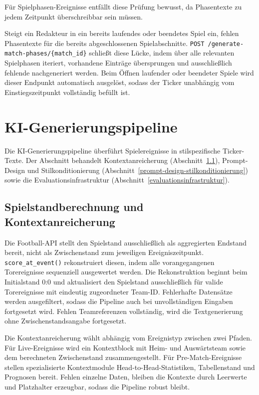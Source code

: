 Für Spielphasen-Ereignisse entfällt diese Prüfung bewusst, da Phasentexte zu jedem Zeitpunkt überschreibbar sein müssen.

Steigt ein Redakteur in ein bereits laufendes oder beendetes Spiel ein, fehlen Phasentexte für die bereits abgeschlossenen Spielabschnitte. \texttt{POST /generate-match-phases/\{match\_id\}} schließt diese Lücke, indem über alle relevanten Spielphasen iteriert, vorhandene Einträge übersprungen und ausschließlich fehlende nachgeneriert werden. Beim Öffnen laufender oder beendeter Spiele wird dieser Endpunkt automatisch ausgelöst, sodass der Ticker unabhängig vom Einstiegszeitpunkt vollständig befüllt ist.


\section{KI-Generierungspipeline}\label{ki-generierungspipeline}

Die KI-Generierungspipeline überführt Spielereignisse in stilspezifische Ticker-Texte. Der Abschnitt behandelt Kontextanreicherung (Abschnitt~\ref{kontextanreicherung-pipeline}), Prompt-Design und Stilkonditionierung (Abschnitt~\ref{prompt-design-stilkonditionierung}) sowie die Evaluationsinfrastruktur (Abschnitt~\ref{evaluationsinfrastruktur}).

\subsection{Spielstandberechnung und Kontextanreicherung}\label{kontextanreicherung-pipeline}

Die Football-API stellt den Spielstand ausschließlich als aggregierten Endstand bereit, nicht als Zwischenstand zum jeweiligen Ereigniszeitpunkt. \texttt{score\_at\_event()} rekonstruiert diesen, indem alle vorangegangenen Torereignisse sequenziell ausgewertet werden. Die Rekonstruktion beginnt beim Initialstand 0:0 und aktualisiert den Spielstand ausschließlich für valide Torereignisse mit eindeutig zugeordneter Team-ID. Fehlerhafte Datensätze werden ausgefiltert, sodass die Pipeline auch bei unvollständigen Eingaben fortgesetzt wird. Fehlen Teamreferenzen vollständig, wird die Textgenerierung ohne Zwischenstandsangabe fortgesetzt.

Die Kontextanreicherung wählt abhängig vom Ereignistyp zwischen zwei Pfaden. Für Live-Ereignisse wird ein Kontextblock mit Heim- und Auswärtsteam sowie dem berechneten Zwischenstand zusammengestellt. Für Pre-Match-Ereignisse stellen spezialisierte Kontextmodule Head-to-Head-Statistiken, Tabellenstand und Prognosen bereit. Fehlen einzelne Daten, bleiben die Kontexte durch Leerwerte und Platzhalter erzeugbar, sodass die Pipeline robust bleibt.

